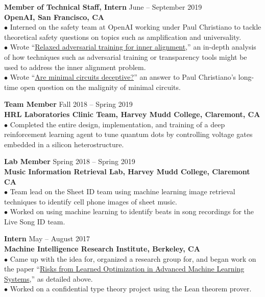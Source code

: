 \documentclass[10pt]{article}
\newcommand{\blankline}{\quad\pagebreak[2]\vspace{-0.3\baselineskip}}
\begin{document}
\blankline

\textbf{Member of Technical Staff, Intern}
\hfill June -- September 2019 \\
\textbf{OpenAI, San Francisco, CA} \\
$\bullet$ Interned on the safety team at OpenAI working under Paul Christiano to tackle theoretical safety questions on topics such as amplification and universality. \\
$\bullet$ Wrote ``\href{https://www.alignmentforum.org/posts/9Dy5YRaoCxH9zuJqa/relaxed-adversarial-training-for-inner-alignment}{Relaxed adversarial training for inner alignment},'' an in-depth analysis of how techniques such as adversarial training or transparency tools might be used to address the inner alignment problem. \\
$\bullet$ Wrote ``\href{https://www.alignmentforum.org/posts/fM5ZWGDbnjb7ThNKJ/are-minimal-circuits-deceptive}{Are minimal circuits deceptive?}'' an answer to Paul Christiano's long-time open question on the malignity of minimal circuits.

\blankline

\textbf{Team Member}
\hfill Fall 2018 -- Spring 2019 \\
\textbf{HRL Laboratories Clinic Team, Harvey Mudd College, Claremont, CA} \\
$\bullet$ Completed the entire design, implementation, and training of a deep reinforcement learning agent to tune quantum dots by controlling voltage gates embedded in a silicon heterostructure.

\blankline

\textbf{Lab Member}
\hfill Spring 2018 -- Spring 2019 \\
\textbf{Music Information Retrieval Lab, Harvey Mudd College, Claremont CA} \\
$\bullet$ Team lead on the Sheet ID team using machine learning image retrieval techniques to identify cell phone images of sheet music. \\
$\bullet$ Worked on using machine learning to identify beats in song recordings for the Live Song ID team.

\blankline

\textbf{Intern}
\hfill May -- August 2017 \\
\textbf{Machine Intelligence Research Institute, Berkeley, CA} \\
$\bullet$ Came up with the idea for, organized a research group for, and began work on the paper ``\href{arxiv.org/abs/1906.01820}{Risks from Learned Optimization in Advanced Machine Learning Systems},'' as detailed above. \\
$\bullet$ Worked on a confidential type theory project using the Lean theorem prover.
\end{document}
